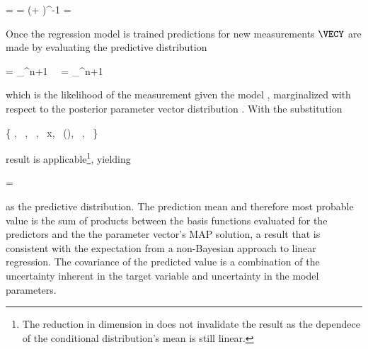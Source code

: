     \placesubformula
    \startformula
    \startalign[n=2,align={right,left}]
        \NC \RPOSTERIOR = \NC \GAUSS{\VECW}{\MEANVEC}{\COVMAT} 
        \NC \COVMAT = \NC (\beta \MATPHIT \MATPHI + \alpha \MATID)^{-1} 
        \NC \MEANVEC = \NC \beta \COVMAT \MATPHIT \VECX \EQSTOP {}
    \stopalign
    \stopformula
    \stopsubformulas

    Once the regression model is trained predictions for new measurements
    $\VECY$ are made by evaluating the predictive distribution

    \startformula
    \startalign[n=2,align={right,left}]
        \NC \RPREDICT = \NC
            \int_{\REALS^{n+1}}  \,
            \RPOSTERIOR \, \diff \VECW \NR
        \NC = \NC
            \int_{\REALS^{n+1}}  \,
                \GAUSS{\VECW}{\MEANVEC}{\COVMAT} \,\diff \VECW \NR
    \stopalign
    \stopformula
    
    which is the likelihood of the measurement given the model
    , marginalized with respect to the posterior
    parameter vector distribution . With the
    substitution

    \startformula
        \{ \VECX \rightarrow \VECW,~
            \VECA \rightarrow \MEANVEC,~
            \MATP \rightarrow \COVMATI,~
            \VECY \rightarrow x,~
            \MATB \rightarrow \VECPHI(\VECY),~
            \VECB {},~
            \MATQ \rightarrow \beta \}
    \stopformula

    result  is applicable\footnote{The reduction in
    dimension in  does not invalidate the result as the
    dependece of the conditional distribution's mean is still linear.},
    yielding

    \startformula
        \RPREDICT = 
    \stopformula

    as the predictive distribution. The prediction mean and therefore most
    probable value is the sum of products between the basis functions evaluated
    for the predictors and the the parameter vector's MAP solution, a result
    that is consistent with the expectation from a non-Bayesian approach to
    linear regression. The covariance of the predicted value is a combination
    of the uncertainty inherent in the target variable and uncertainty in the
    model parameters.


